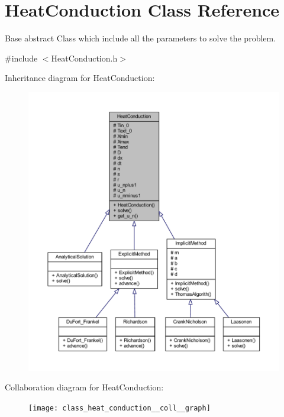 \hypertarget{class_heat_conduction}{}\section{Heat\+Conduction Class Reference}
\label{class_heat_conduction}


Base abstract Class which include all the parameters to solve the problem.  




{\ttfamily \#include $<$Heat\+Conduction.\+h$>$}



Inheritance diagram for Heat\+Conduction\+:
\nopagebreak
\begin{figure}[H]
\begin{center}
\leavevmode
\includegraphics[width=350pt]{class_heat_conduction__inherit__graph}
\end{center}
\end{figure}


Collaboration diagram for Heat\+Conduction\+:
\nopagebreak
\begin{figure}[H]
\begin{center}
\leavevmode
\texttt{[image: class\_heat\_conduction\_\_coll\_\_graph]}
\end{center}
\end{figure}
